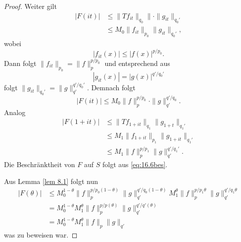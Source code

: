 \documentclass[
paper=a4,
bibtotocnumbered,
liststotocnumbered,
tablecaptionabove,
pointlessnumbers,
twoside,
openright,
10pt
]
{report}
\theoremstyle{definition}
\numberwithin{equation}{chapter}
\begin{document}
\begin{proof}
Weiter gilt
\begin{align*}
|F(it)|&\le \| Tf_{it}\|_{q_0} \|\cdot \|g_{it}\|_{q_0'}\\
&\le M_0 \| f_{it} \|_{p_0} \| g_{it} \|_{q_0'},
\end{align*}
wobei 
\begin{equation}
|f_{it}(x)|\le | f(x)|^{p/p_0}.
\end{equation}
Dann folgt $\| f_{it}\|_{p_0} = \| f\|_p^{p/p_0}$ und entsprechend aus
\begin{equation}
|g_{it}(x)| = |g(x)|^{q'/q_0'}
\end{equation}
folgt  $\| g_{it}\|_{q_0'} = \|g\|_{q'}^{q'/q_0'}$.
Demnach folgt
\begin{equation}
|F(it)|\le M_0 \| f\|_p^{p/p_0} \cdot \| g\|_{q'}^{q'/q_0}.
\end{equation}
Analog
\begin{align*}
|F(1+it)|&\le \| Tf_{1+it} \|_{q_1} \| g_{1+t} \|_{q_1'} \\
&\le M_1 \| f_{1+it} \|_{p_1} \| g_{1+it} \|_{q_1'} \\
&\le M_1\|f\|_p^{p/p_1} \| g\|_{q'}^{q'/q_1'}.
\end{align*}
Die Beschränktheit von $F$ auf $S$ folgt aus \eqref{eq:16.6bes}.  

Aus Lemma \ref{lem 8.1} folgt nun
\begin{align*}
|F(\theta)| &\le M_0^{1-\theta} \| f\|_p^{p/p_0(1-\theta)} \| g\|_{q'} ^{q'/q_0(1-\theta)} M_1^\theta \| f\|_p^{p/p_1 \theta} \| g\|_{q'}^{q'/q_1 \theta}\\
&= M_0^{1-\theta} M_1^\theta \| f\|_p^{p/p(\theta)} \| g\|_{q'}^{q'/q'(\theta)}\\
&= M_0^{1-\theta} M_1^\theta \| f\|_p \| g\|_{q'}
\end{align*} 
was zu beweisen war.
\end{proof}
\end{document}
